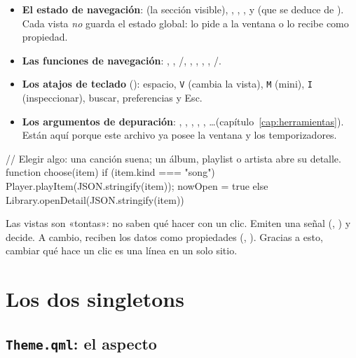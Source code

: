 \begin{itemize}
  \item \textbf{El estado de navegación}:  (la sección visible),
  , , ,  y 
  (que se deduce de ). Cada vista \emph{no} guarda el estado
  global: lo pide a la ventana o lo recibe como propiedad.
  \item \textbf{Las funciones de navegación}: , ,
  /, , , , ,
  /.
  \item \textbf{Los atajos de teclado} (): espacio, \texttt{V} (cambia la
  vista), \texttt{M} (mini), \texttt{I} (inspeccionar), buscar, preferencias y Esc.
  \item \textbf{Los argumentos de depuración}: , , ,
  , , \dots (capítulo~\ref{cap:herramientas}). Están
  aquí porque este archivo ya posee la ventana y los temporizadores.
\end{itemize}

\begin{qml}
// Elegir algo: una canción suena; un álbum, playlist o artista abre su detalle.
function choose(item) {
    if (item.kind === "song") { Player.playItem(JSON.stringify(item)); nowOpen = true }
    else Library.openDetail(JSON.stringify(item))
}
\end{qml}

\begin{idea}
Las vistas son «tontas»: no saben qué hacer con un clic. Emiten una señal
(, ) y  decide. A cambio, reciben
los datos como propiedades (, ). Gracias a esto, cambiar qué hace un
clic es una línea en un solo sitio.
\end{idea}

\section{Los dos singletons}

\subsection{\texttt{Theme.qml}: el aspecto}

